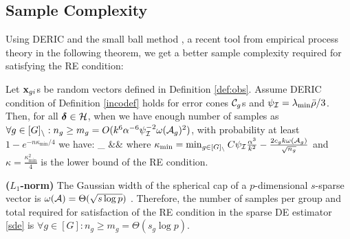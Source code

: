 \subsection{Sample Complexity}
 Using DERIC and the small ball method \cite{mend15}, a recent tool from empirical process theory in the following theorem, we get a better sample complexity required for satisfying the RE condition:
\begin{theorem}
	\label{theo:re}
	Let $\mathbf{x}_{gi}$s	be random vectors defined in Definition \ref{def:obs}.
	Assume DERIC condition of Definition \ref{incodef} holds for error cones $\cC_g$s and $\rinc=\lamin\ratio/3$.
	Then, for all $\ddelta \in \cH$, when we have enough number of samples as $\forall g \in [G]_{\setminus}: n_g \geq m_g = O(k^6 \alpha^{-6} \rinc^{-2} \omega(\cA_g)^2)$, with probability at least $1 - e^{-n \kappa_{\min}/4}$  we have:
	\be
	\nr
	\inf_{\ddelta \in \cH}   &\geq& 
	\ee
	where $\kappa_{\min} = \min_{g\in [G]_\setminus} C \rinc \frac{\alpha^3}{k^2}  - \frac{2 c_g k \omega(\cA_g)}{\sqrt{n_g}}$ and $\kappa = \frac{\kappa_{\min}^2}{4}$ is the lower bound of the RE condition.
\end{theorem}

\begin{example}
	{\bf ($L_1$-norm)} The Gaussian width of the spherical cap of a $p$-dimensional $s$-sparse vector is $\omega(\cA) = \Theta(\sqrt{s\log p})$ \cite{banerjee14, vershynin2018high}. Therefore, the number of samples per group and total required for satisfaction of the RE condition in the sparse DE estimator \eqref{sde} is $\forall g \in [G]: n_g \geq m_g = \Theta(s_g \log p)$. 
\end{example}



